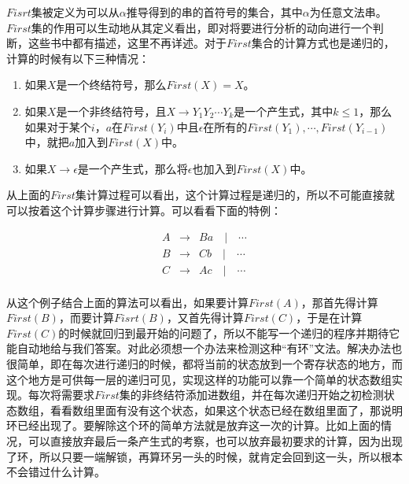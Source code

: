 $Fisrt$集被定义为可以从$\alpha$推导得到的串的首符号的集合，其中$\alpha$为任意文法串。$First$集的作用可以生动地从其定义看出，即对将要进行分析的动向进行一个判断，这些书中都有描述，这里不再详述。对于$First$集合的计算方式也是递归的，计算的时候有以下三种情况：

\begin{enumerate}
    \item 如果$X$是一个终结符号，那么$First(X)=X$。
    \item 如果$X$是一个非终结符号，且$X \rightarrow Y_1 Y_2 \cdots Y_k$是一个产生式，其中$k \leq 1$，那么如果对于某个$i$，$a$在$First(Y_i)$中且$\epsilon$在所有的$First(Y_1),\cdots,First(Y_{i-1})$中，就把$a$加入到$First(X)$中。
    \item 如果$X \rightarrow \epsilon$是一个产生式，那么将$\epsilon$也加入到$First(X)$中。
\end{enumerate}

从上面的$First$集计算过程可以看出，这个计算过程是递归的，所以不可能直接就可以按着这个计算步骤进行计算。可以看看下面的特例：

\begin{eqnarray*}
    A & \rightarrow & Ba \quad | \quad \cdots \\
    B & \rightarrow & Cb \quad | \quad \cdots \\
    C & \rightarrow & Ac \quad | \quad \cdots \\
\end{eqnarray*}

从这个例子结合上面的算法可以看出，如果要计算$First(A)$，那首先得计算$First(B)$，而要计算$Fisrt(B)$，又首先得计算$First(C)$，于是在计算$First(C)$的时候就回归到最开始的问题了，所以不能写一个递归的程序并期待它能自动地给与我们答案。对此必须想一个办法来检测这种“有环”文法。解决办法也很简单，即在每次进行递归的时候，都将当前的状态放到一个寄存状态的地方，而这个地方是可供每一层的递归可见，实现这样的功能可以靠一个简单的状态数组实现。每次将需要求$First$集的非终结符添加进数组，并在每次递归开始之初检测状态数组，看看数组里面有没有这个状态，如果这个状态已经在数组里面了，那说明环已经出现了。要解除这个环的简单方法就是放弃这一次的计算。比如上面的情况，可以直接放弃最后一条产生式的考察，也可以放弃最初要求的计算，因为出现了环，所以只要一端解锁，再算环另一头的时候，就肯定会回到这一头，所以根本不会错过什么计算。

\newpage

